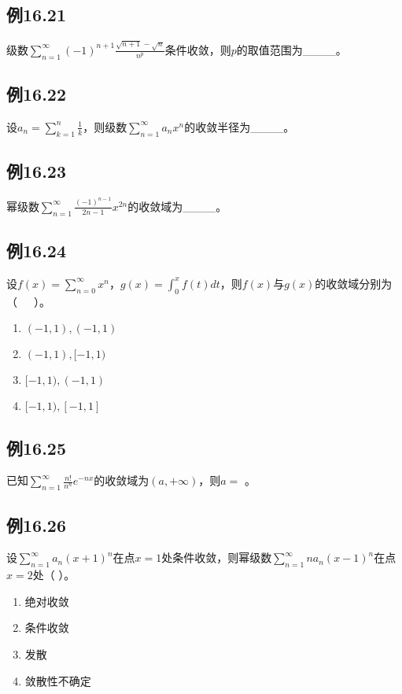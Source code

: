 \documentclass[UTF8]{ctexart}
\theoremstyle{remark}
\begin{document}
\begin{multicols}{2}
	\subsection*{例16.21}
	级数\(\sum_{n = 1}^{\infty}(-1)^{n + 1}\frac{\sqrt{n + 1}-\sqrt{n}}{n^{p}}\)条件收敛，则\(p\)的取值范围为\_\_\_\_。
	
	\subsection*{例16.22}
	设\(a_{n}=\sum_{k = 1}^{n}\frac{1}{k}\)，则级数\(\sum_{n = 1}^{\infty}a_{n}x^{n}\)的收敛半径为\_\_\_\_。
	
	\subsection*{例16.23}
	幂级数\(\sum_{n = 1}^{\infty}\frac{(-1)^{n - 1}}{2n - 1}x^{2n}\)的收敛域为\_\_\_\_。
	
	\subsection*{例16.24}
	设\(f(x)=\sum_{n = 0}^{\infty}x^{n}\)，\(g(x)=\int_{0}^{x}f(t)dt\)，则\(f(x)\)与\(g(x)\)的收敛域分别为（~~~）。
	\begin{enumerate}[label=(\Alph*)]
		\item \((-1,1), (-1,1)\)
		\item \((-1,1), [-1,1)\)
		\item \([-1,1), (-1,1)\)
		\item \([-1,1), [-1,1]\)
	\end{enumerate}
	
	\subsection*{例16.25}
	已知\(\sum_{n = 1}^{\infty}\frac{n!}{n^{n}}e^{-nx}\)的收敛域为\((a, +\infty)\)，则\(a = \)  。
	
	\subsection*{例16.26}
	设\(\sum_{n = 1}^{\infty}a_{n}(x + 1)^{n}\)在点\(x = 1\)处条件收敛，则幂级数\(\sum_{n = 1}^{\infty}na_{n}(x - 1)^{n}\)在点\(x = 2\)处（  ）。
	\begin{enumerate}[label=(\Alph*)]
		\item 绝对收敛
		\item 条件收敛
		\item 发散
		\item 敛散性不确定
	\end{enumerate}
	

\end{multicols}
\end{document}
